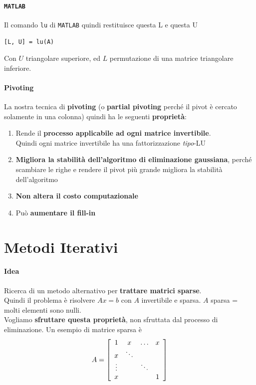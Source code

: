 \documentclass[10pt]{book}
\begin{document}
\paragraph{\texttt{MATLAB}} Il comando \texttt{lu} di \texttt{MATLAB} quindi restituisce questa L e questa U
\begin{lstlisting}
[L, U] = lu(A)
\end{lstlisting}
Con $U$ triangolare superiore, ed $L$ permutazione di una matrice triangolare inferiore.
\paragraph{Pivoting} La nostra tecnica di \textbf{pivoting} (o \textbf{partial pivoting} perché il pivot è cercato solamente in una colonna) quindi ha le seguenti \textbf{proprietà}:
\begin{enumerate}
	\item Rende il \textbf{processo applicabile ad ogni matrice invertibile}.\\
	Quindi ogni matrice invertibile ha una fattorizzazione \textit{tipo}-LU
	\item \textbf{Migliora la stabilità dell'algoritmo di eliminazione gaussiana}, perché scambiare le righe e rendere il pivot più grande migliora la stabilità dell'algoritmo
	\item \textbf{Non altera il costo computazionale}
	\item Può \textbf{aumentare il fill-in}
\end{enumerate}
\section{Metodi Iterativi}
\paragraph{Idea} Ricerca di un metodo alternativo per \textbf{trattare matrici sparse}.\\
Quindi il problema è risolvere $Ax = b$ con $A$ invertibile e sparsa. $A$ sparsa = molti elementi sono nulli.\\
Vogliamo \textbf{sfruttare questa proprietà}, non sfruttata dal processo di eliminazione. Un esempio di matrice sparsa è
$$A = \left[
\begin{array}{c c c c}
1 & x & \ldots & x \\
x & \ddots \\
\vdots & & \ddots & \\
x & & & 1
\end{array}
\right] $$
\end{document}

